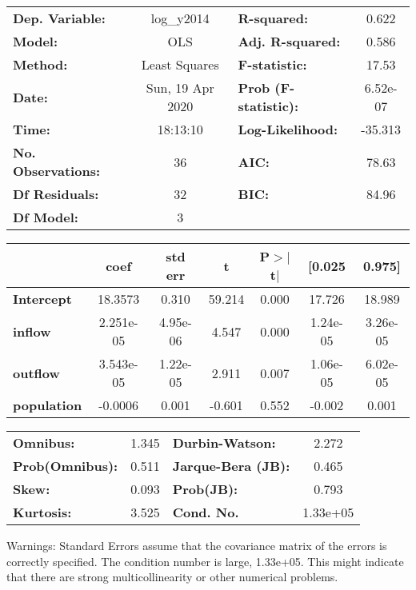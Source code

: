 \begin{center}
\begin{tabular}{lclc}
\toprule
\textbf{Dep. Variable:}    &    log\_y2014    & \textbf{  R-squared:         } &     0.622   \\
\textbf{Model:}            &       OLS        & \textbf{  Adj. R-squared:    } &     0.586   \\
\textbf{Method:}           &  Least Squares   & \textbf{  F-statistic:       } &     17.53   \\
\textbf{Date:}             & Sun, 19 Apr 2020 & \textbf{  Prob (F-statistic):} &  6.52e-07   \\
\textbf{Time:}             &     18:13:10     & \textbf{  Log-Likelihood:    } &   -35.313   \\
\textbf{No. Observations:} &          36      & \textbf{  AIC:               } &     78.63   \\
\textbf{Df Residuals:}     &          32      & \textbf{  BIC:               } &     84.96   \\
\textbf{Df Model:}         &           3      & \textbf{                     } &             \\
\bottomrule
\end{tabular}
\begin{tabular}{lcccccc}
                    & \textbf{coef} & \textbf{std err} & \textbf{t} & \textbf{P$> |$t$|$} & \textbf{[0.025} & \textbf{0.975]}  \\
\midrule
\textbf{Intercept}  &      18.3573  &        0.310     &    59.214  &         0.000        &       17.726    &       18.989     \\
\textbf{inflow}     &    2.251e-05  &     4.95e-06     &     4.547  &         0.000        &     1.24e-05    &     3.26e-05     \\
\textbf{outflow}    &    3.543e-05  &     1.22e-05     &     2.911  &         0.007        &     1.06e-05    &     6.02e-05     \\
\textbf{population} &      -0.0006  &        0.001     &    -0.601  &         0.552        &       -0.002    &        0.001     \\
\bottomrule
\end{tabular}
\begin{tabular}{lclc}
\textbf{Omnibus:}       &  1.345 & \textbf{  Durbin-Watson:     } &    2.272  \\
\textbf{Prob(Omnibus):} &  0.511 & \textbf{  Jarque-Bera (JB):  } &    0.465  \\
\textbf{Skew:}          &  0.093 & \textbf{  Prob(JB):          } &    0.793  \\
\textbf{Kurtosis:}      &  3.525 & \textbf{  Cond. No.          } & 1.33e+05  \\
\bottomrule
\end{tabular}
\end{center}

Warnings: \newline
 [1] Standard Errors assume that the covariance matrix of the errors is correctly specified. \newline
 [2] The condition number is large, 1.33e+05. This might indicate that there are \newline
 strong multicollinearity or other numerical problems.